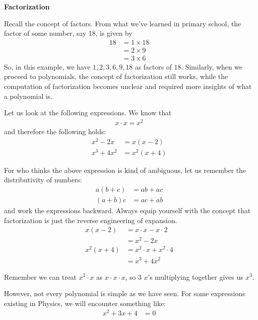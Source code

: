 \documentclass[12pt]{article}
\begin{document}
    \pagestyle{fancy}
    \begin{center}
        \textbf{Factorization}
    \end{center}

    Recall the concept of factors. From what we've learned in primary school, the factor of some number, say 18, is given by \begin{align*}
        18&=1\times 18\\
        &=2\times 9\\
        &=3\times 6
    \end{align*}
    So, in this example, we have $1,2,3,6,9,18$ as factors of $18$. Similarly, when we proceed to polynomials, the concept of factorization still works, while the computation of factorization becomes unclear and required more insights of what a polynomial is.

    Let us look at the following expressions. We know that \begin{align*}
        x\cdot x=x^2
    \end{align*} and therefore the following holds:\begin{align*}
        x^2-2x&=x(x-2)\\
        x^3+4x^2&=x^2(x+4)
    \end{align*}

    For who thinks the above expression is kind of ambiguous, let us remember the distributivity of numbers:\begin{align*}
        a(b+c)&=ab+ac\\
        (a+b)c&=ac+ab
    \end{align*} and work the expressions backward. Always equip yourself with the concept that factorization is just the reverse engineering of expansion.\begin{align*}
        x(x-2)&=x\cdot x-x\cdot 2\\
        &=x^2-2x\\
        x^2(x+4)&=x^2\cdot x+x^2\cdot 4\\
        &=x^3+4x^2
    \end{align*}

    Remember we can treat $x^2\cdot x$ as $x\cdot x\cdot x$, so 3 $x$'s multiplying together gives us $x^3$.

    However, not every polynomial is simple as we have seen. For some expressions existing in Physics, we will encounter something like:\begin{align*}
        x^2+3x+4&=0
    \end{align*}
\end{document}
